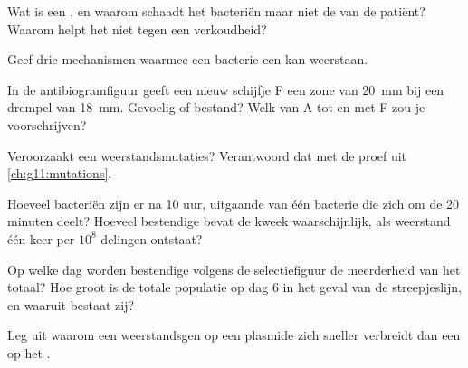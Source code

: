 \begin{exercise}[$\star$]\label{exo:g11:antibiotic-resistance:2}
Wat is een , en waarom schaadt het bacteriën maar niet de
 van de patiënt? Waarom helpt het niet tegen een verkoudheid?
\end{exercise}

\begin{exercise}[$\star$]\label{exo:g11:antibiotic-resistance:3}
Geef drie mechanismen waarmee een bacterie een  kan
weerstaan.
\end{exercise}

\begin{exercise}[$\star$]\label{exo:g11:antibiotic-resistance:4}
In de antibiogramfiguur geeft een nieuw schijfje F een zone van
\qty{20}{mm} bij een drempel van \qty{18}{mm}. Gevoelig of bestand? Welk
 van A tot en met F zou je voorschrijven?
\end{exercise}

\begin{exercise}[$\star$]\label{exo:g11:antibiotic-resistance:5}
Veroorzaakt een  weerstandsmutaties? Verantwoord dat met de
proef uit \cref{ch:g11:mutations}.
\end{exercise}

\begin{exercise}[$\star\star$]\label{exo:g11:antibiotic-resistance:6}
Hoeveel bacteriën zijn er na 10 uur, uitgaande van één bacterie die zich
om de 20 minuten deelt? Hoeveel bestendige  bevat de kweek
waarschijnlijk, als weerstand één keer per $10^8$ delingen ontstaat?
\end{exercise}

\begin{exercise}[$\star\star$]\label{exo:g11:antibiotic-resistance:7}
Op welke dag worden bestendige  volgens de selectiefiguur de
meerderheid van het totaal? Hoe groot is de totale populatie op dag 6 in
het geval van de streepjeslijn, en waaruit bestaat zij?
\end{exercise}

\begin{exercise}[$\star\star$]\label{exo:g11:antibiotic-resistance:8}
Leg uit waarom een weerstandsgen op een plasmide zich sneller verbreidt
dan een  op het .
\end{exercise}

